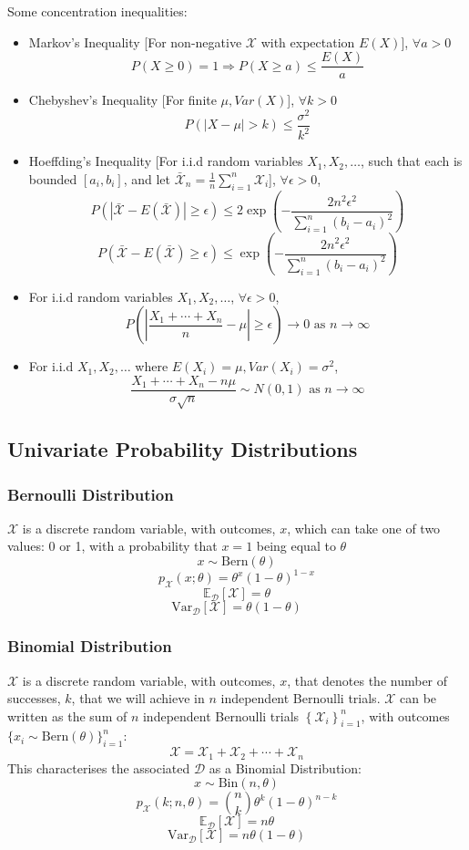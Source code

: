 Some concentration inequalities:
\begin{itemize}
  \item Markov's Inequality [For non-negative $\mathcal{X}$ with expectation $E(X)$], $\forall a>0$
    \[P(X\ge0)=1\Rightarrow P(X\ge a)\le \frac{E(X)}{a}\]
  \item Chebyshev's Inequality [For finite $\mu,Var(X)$], $\forall k>0$
  \[P(|X-\mu|>k)\le \frac{\sigma^{2}}{k^{2}}\]
  \item Hoeffding's Inequality [For i.i.d random variables $X_1,X_2,\ldots$,
    such that each is bounded $[a_i,b_i]$, and let
    $\bar{\mathcal{X}}_{n}=\frac{1}{n}\sum_{i=1}^{n} \mathcal{X}_i$],
    $\forall\epsilon>0$,
    \[P(|\bar{\mathcal{X}}-E(\bar{\mathcal{X}})|\ge\epsilon)\le2
\exp(-\frac{2n^{2}\epsilon^{2}}{\sum_{i=1}^{n} {(b_i-a_i)}^{2}})\]
  \[ P(\bar{\mathcal{X}}-E(\bar{\mathcal{X}})\ge\epsilon)\le
  \exp(-\frac{2n^{2}\epsilon^{2}}{\sum_{i=1}^{n} {(b_i-a_i)}^{2}})\]
  \item For i.i.d random variables $X_1,X_2,\ldots$, $\forall\epsilon>0$,
    \[P(|\frac{X_1+\cdots+X_n}{n}-\mu|\ge\epsilon)\to0\text{ as }n\to\infty\]
  \item For i.i.d $X_1,X_2,\ldots$ where $E(X_i)=\mu, Var(X_i)=\sigma^{2}$,
    \[\frac{X_1+\cdots+X_n-n\mu}{\sigma\sqrt{n}}\sim N(0,1)\text{ as }n\to\infty\]
\end{itemize}

\subsection{Univariate Probability Distributions}
\subsubsection{Bernoulli Distribution}
${\mathcal{X}}$ is a discrete random variable, with outcomes, $x$, which can take one of two values: 0 or 1, with a probability that $x=1$ being equal to $\theta$
\[x \sim \text{Bern}(\theta)\]
\[p_{\mathcal{X}}(x ; \theta) = \theta^x {(1-\theta)}^{1-x}\]
\[\mathbb{E}_{\mathcal{D}}[\mathcal{X}] = \theta\]
\[\text{Var}_{\mathcal{D}}[\mathcal{X}] = \theta (1-\theta)\]
\subsubsection{Binomial Distribution}
${\mathcal{X}}$ is a discrete random variable, with outcomes, $x$, that denotes
the number of successes, $k$, that we will achieve in $n$ independent Bernoulli
trials. ${\mathcal{X}}$ can be written as the sum of $n$ independent Bernoulli trials
${\left\{\mathcal{X}_i\right\}}_{i=1}^n$, with outcomes ${\{x_i \sim \mbox{Bern}(\theta)\}}_{i=1}^n$:
\[\mathcal{X} = \mathcal{X}_1 + \mathcal{X}_2 +\cdots + \mathcal{X}_n\]
This characterises the associated $\mathcal{D}$ as a Binomial Distribution:
\[x \sim \text{Bin}(n, \theta)\]
\[p_{\mathcal{X}}(k ; n, \theta) = \binom{n}{k} \theta^k {(1-\theta)}^{n-k}\]
\[\mathbb{E}_{\mathcal{D}}[\mathcal{X}] = n \theta\]
\[\text{Var}_{\mathcal{D}}[\mathcal{X}] = n \theta (1-\theta)\]
